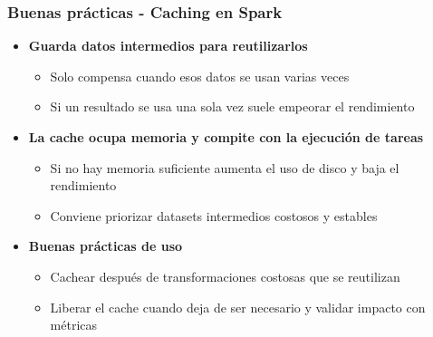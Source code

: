 \documentclass[aspectratio=169]{beamer}
\begin{document}
\begin{frame}\frametitle{Buenas prácticas - Caching en Spark}
\begin{itemize}
  \item \textbf{Guarda datos intermedios para reutilizarlos}
  \begin{itemize}
    \item Solo compensa cuando esos datos se usan varias veces
    \item Si un resultado se usa una sola vez suele empeorar el rendimiento
  \end{itemize}

  \vspace{1em}

  \item \textbf{La cache ocupa memoria y compite con la ejecución de tareas}
  \begin{itemize}
    \item Si no hay memoria suficiente aumenta el uso de disco y baja el rendimiento
    \item Conviene priorizar datasets intermedios costosos y estables
  \end{itemize}

  \vspace{1em}

  \item \textbf{Buenas prácticas de uso}
  \begin{itemize}
    \item Cachear después de transformaciones costosas que se reutilizan
    \item Liberar el cache cuando deja de ser necesario y validar impacto con métricas
  \end{itemize}
\end{itemize}
\end{frame}
\end{document}
